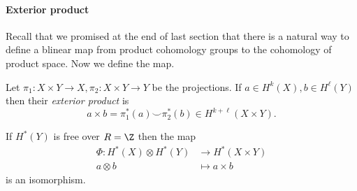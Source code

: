 \documentclass[a4paper]{article}
\newcommand*{\cp}{\smile} %
\begin{document}
\paragraph{Exterior product}

Recall that we promised at the end of last section that there is a natural way to define a blinear map from product cohomology groups to the cohomology of product space. Now we define the map. 

\begin{definition}
  Let \(\pi_1: X \times Y \to X, \pi_2: X \times Y \to Y\) be the projections. If \(a \in H^k(X), b \in H^\ell(Y)\) then their \emph{exterior product} is
  \[
    a \times b = \pi_1^*(a) \cp \pi_2^*(b) \in H^{k + \ell}(X \times Y).
  \]
\end{definition}

\begin{theorem}
  If \(H^*(Y)\) is free over \(R = \Z\) then the map
  \begin{align*}
    \Phi: H^*(X) \otimes H^*(Y) &\to H^*(X \times Y) \\
    a \otimes b &\mapsto a \times b
  \end{align*}
  is an isomorphism.
\end{theorem}
\end{document}
